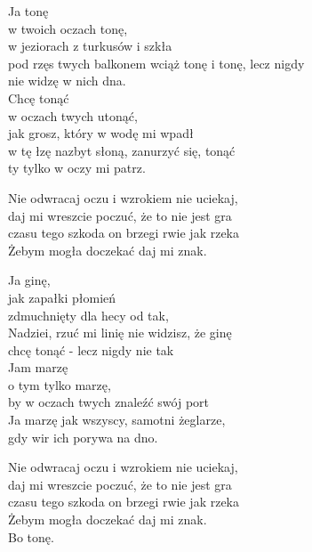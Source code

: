 \begin{text}

    Ja tonę\\
    w twoich oczach tonę,\\
    w jeziorach z turkusów i szkła\\
    pod rzęs twych balkonem wciąż tonę i tonę, lecz nigdy\\
    nie widzę w nich dna.\\
    Chcę tonąć\\
    w oczach twych utonąć,\\
    jak grosz, który w wodę mi wpadł\\
    w tę łzę nazbyt słoną, zanurzyć się, tonąć\\
    ty tylko w oczy mi patrz.

    Nie odwracaj oczu i wzrokiem nie uciekaj,\\
    daj mi wreszcie poczuć, że to nie jest gra\\
    czasu tego szkoda on brzegi rwie jak rzeka\\
    Żebym mogła doczekać daj mi znak.

    Ja ginę,\\
    jak zapałki płomień\\
    zdmuchnięty dla hecy od tak,\\
    Nadziei, rzuć mi linię nie widzisz, że ginę\\
    chcę tonąć - lecz nigdy nie tak\\
    Jam marzę\\
    o tym tylko marzę,\\
    by w oczach twych znaleźć swój port\\
    Ja marzę jak wszyscy, samotni żeglarze,\\
    gdy wir ich porywa na dno.

    Nie odwracaj oczu i wzrokiem nie uciekaj,\\
    daj mi wreszcie poczuć, że to nie jest gra\\
    czasu tego szkoda on brzegi rwie jak rzeka\\
    Żebym mogła doczekać daj mi znak.\\
    Bo tonę.

\end{text}
